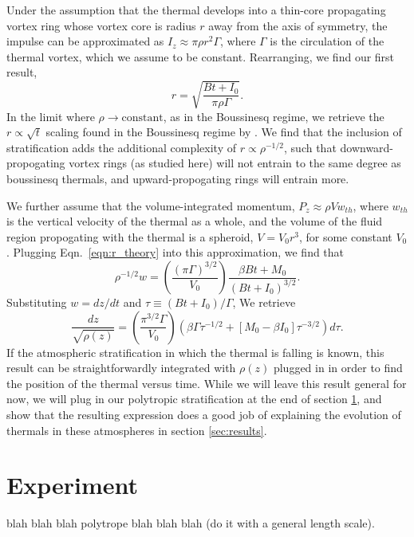 \documentclass[twocolumn, amsmath, amsfonts, amssymb, trackchanges]{aastex62}
\begin{document}
Under the assumption that the thermal develops into a thin-core 
propagating vortex ring whose vortex core is radius $r$ away from the axis of symmetry, 
the impulse can be approximated as $I_z \approx \pi \rho r^2 \Gamma$, where 
$\Gamma$ is the circulation of the thermal vortex, which we assume to be constant. 
Rearranging, we find our first result,
\begin{equation}
r = \sqrt{\frac{B t + I_0}{\pi\rho\Gamma}}.
\label{eqn:r_theory}
\end{equation}
In the limit where $\rho \rightarrow \text{constant}$, as in the Boussinesq regime,
we retrieve the $r \propto \sqrt{t}$ scaling found in the Boussinesq regime by
\citet{lecoanet&jeevanjee2018}. We find that the inclusion of stratification adds the
additional complexity of $r \propto \rho^{-1/2}$, such that downward-propogating 
vortex rings (as studied here) will not entrain to the same degree as boussinesq thermals,
and upward-propogating rings will entrain more.

We further assume that the volume-integrated momentum, $P_z \approx \rho V w_{th}$,
where $w_{th}$ is the vertical velocity of the thermal as a whole, and the volume
of the fluid region propogating with the thermal is a spheroid, $V = V_0 r^3$, for
some constant $V_0$. Plugging Eqn.~\ref{eqn:r_theory} into this approximation, we
find that
\begin{equation}
\rho^{-1/2}w = \left(\frac{(\pi\Gamma)^{3/2}}{V_0}\right)\frac{\beta B t + M_0}{(B t + I_0)^{3/2}}.
\end{equation}
Substituting $w = dz/dt$ and $\tau \equiv (Bt + I_0)/\Gamma$, We retrieve
\begin{equation}
\frac{dz}{\sqrt{\rho(z)}} 
= \left(\frac{\pi^{3/2}\Gamma}{V_0}\right)
\left(\beta\Gamma\tau^{-1/2} + [M_0 - \beta I_0]\tau^{-3/2}\right)d\tau.
\end{equation}
If the atmospheric stratification in which the thermal is falling is known, this
result can be straightforwardly integrated with $\rho(z)$ plugged in in order to
find the position of the thermal versus time. While we will leave this result
general for now, we will plug in our polytropic stratification at the end of
section \ref{sec:experiment}, and show that the resulting expression does a
good job of explaining the evolution of thermals in these atmospheres in
section \ref{sec:results}.

\section{Experiment} 
\label{sec:experiment}
blah blah blah polytrope blah blah blah (do it with a general length scale).
\end{document}
